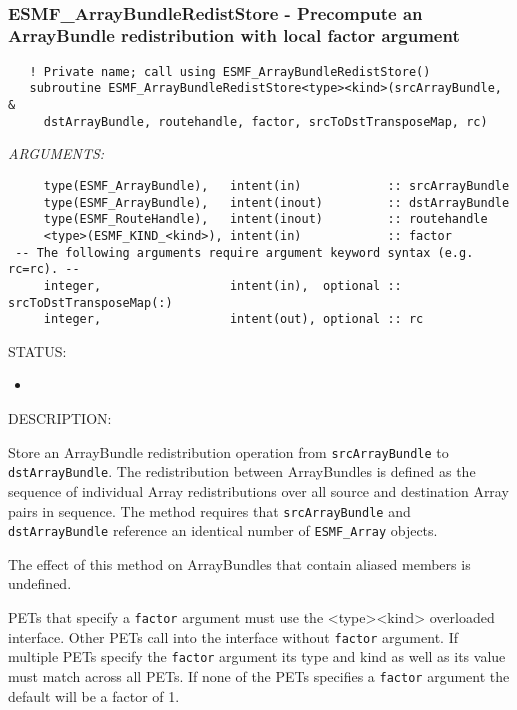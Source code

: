  
\mbox{}\hrulefill\ 
 
\subsubsection [ESMF\_ArrayBundleRedistStore] {ESMF\_ArrayBundleRedistStore - Precompute an ArrayBundle redistribution with local factor argument}


  
\begin{verbatim}   ! Private name; call using ESMF_ArrayBundleRedistStore()
   subroutine ESMF_ArrayBundleRedistStore<type><kind>(srcArrayBundle, &
     dstArrayBundle, routehandle, factor, srcToDstTransposeMap, rc)\end{verbatim}{\em ARGUMENTS:}
\begin{verbatim}     type(ESMF_ArrayBundle),   intent(in)            :: srcArrayBundle
     type(ESMF_ArrayBundle),   intent(inout)         :: dstArrayBundle
     type(ESMF_RouteHandle),   intent(inout)         :: routehandle
     <type>(ESMF_KIND_<kind>), intent(in)            :: factor
 -- The following arguments require argument keyword syntax (e.g. rc=rc). --
     integer,                  intent(in),  optional :: srcToDstTransposeMap(:)
     integer,                  intent(out), optional :: rc\end{verbatim}
{\sf STATUS:}
   \begin{itemize}
   \item{}
   \end{itemize}
  
{\sf DESCRIPTION:\\ }


     Store an ArrayBundle redistribution operation from
     {\tt srcArrayBundle} to {\tt dstArrayBundle}. The redistribution
     between ArrayBundles is defined as the sequence of
     individual Array redistributions over all source and
     destination Array pairs in sequence. The method requires that
     {\tt srcArrayBundle} and {\tt dstArrayBundle} reference an identical
     number of {\tt ESMF\_Array} objects.
  
     The effect of this method on ArrayBundles that contain aliased members is
     undefined.
  
     PETs that specify a {\tt factor} argument must use the
     <type><kind> overloaded interface. Other PETs call into the interface
     without {\tt factor} argument. If multiple PETs specify the {\tt factor}
     argument its type and kind as well as its value must match across all
     PETs. If none of the PETs specifies a {\tt factor} argument the default
     will be a factor of 1.
  
